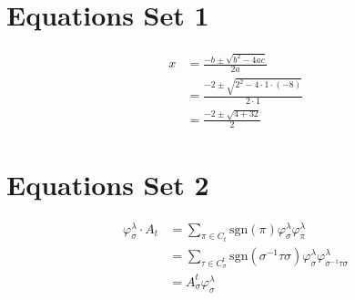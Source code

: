 \documentclass{article}
\begin{document}
\section*{Equations Set 1}
\begin{align*}
x &= \frac{-b \pm \sqrt{b^2 - 4ac}}{2a} \\
  &= \frac{-2 \pm \sqrt{2^2 - 4 \cdot 1 \cdot (-8)}}{2 \cdot 1} \\
  &= \frac{-2 \pm \sqrt{4 + 32}}{2}
\end{align*}

\section*{Equations Set 2}
\begin{align*}
\varphi_{\sigma}^{\lambda} \cdot A_{t} &= \sum_{\pi \in C_{t}} \text{sgn}(\pi) \varphi_{\sigma}^{\lambda} \varphi_{\pi}^{\lambda} \\
&= \sum_{\tau \in C_{\sigma}^{t}} \text{sgn}(\sigma^{-1} \tau \sigma) \varphi_{\sigma}^{\lambda} \varphi_{\sigma^{-1} \tau \sigma}^{\lambda} \\
&= A_{\sigma}^{t} \varphi_{\sigma}^{\lambda}
\end{align*}
\end{document}
